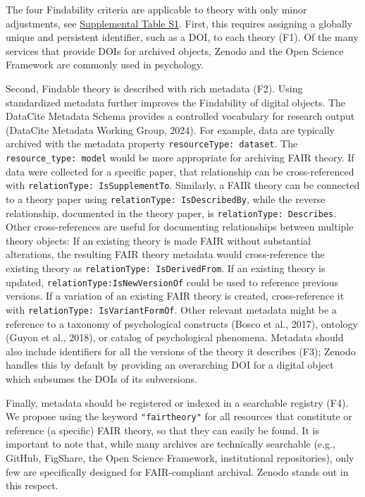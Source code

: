 \documentclass[
  man, noextraspace,floatsintext]{apa7}
\begin{document}
The four Findability criteria are applicable to theory with only minor adjustments, see \href{https://github.com/cjvanlissa/fair_theory/blob/main/fair_principles.csv}{Supplemental Table S1}.
First, this requires assigning a globally unique and persistent identifier, such as a DOI, to each theory (F1).
Of the many services that provide DOIs for archived objects,
Zenodo and the Open Science Framework are commonly used in psychology.

Second, Findable theory is described with rich metadata (F2).
Using standardized metadata further improves the Findability of digital objects.
The DataCite Metadata Schema provides a controlled vocabulary for research output (DataCite Metadata Working Group, 2024).
For example, data are typically archived with the metadata property \texttt{resourceType:\ dataset}.
The \texttt{resource\_type:\ model} would be more appropriate for archiving FAIR theory.
If data were collected for a specific paper, that relationship can be cross-referenced with \texttt{relationType:\ IsSupplementTo}.
Similarly, a FAIR theory can be connected to a theory paper using \texttt{relationType:\ IsDescribedBy},
while the reverse relationship, documented in the theory paper, is \texttt{relationType:\ Describes}.
Other cross-references are useful for documenting relationships between multiple theory objects: If an existing theory is made FAIR without substantial alterations,
the resulting FAIR theory metadata would cross-reference the existing theory as \texttt{relationType:\ IsDerivedFrom}.
If an existing theory is updated, \texttt{relationType:IsNewVersionOf} could be used to reference previous versions.
If a variation of an existing FAIR theory is created, cross-reference it with \texttt{relationType:\ IsVariantFormOf}.
Other relevant metadata might be a reference to a taxonomy of psychological constructs (Bosco et al., 2017),
ontology (Guyon et al., 2018),
or catalog of psychological phenomena.
Metadata should also include identifiers for all the versions of the theory it describes (F3);
Zenodo handles this by default by providing an overarching DOI for a digital object which subsumes the DOIs of its subversions.

Finally, metadata should be registered or indexed in a searchable registry (F4).
We propose using the keyword \texttt{"fairtheory"} for all resources that constitute or reference (a specific) FAIR theory,
so that they can easily be found.
It is important to note that, while many archives are technically searchable (e.g., GitHub, FigShare, the Open Science Framework, institutional repositories),
only few are specifically designed for FAIR-compliant archival.
Zenodo stands out in this respect.
\end{document}
